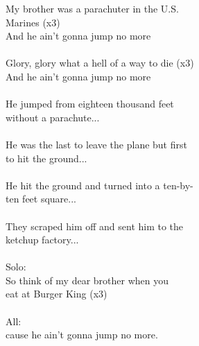 
My brother was a parachuter in the U.S. \\ Marines (x3) \\ And he ain't gonna jump no more \\ \hspace{10mm} \\ Glory, glory what a hell of a way to die (x3) \\ And he ain't gonna jump no more \\ \hspace{10mm} \\ He jumped from eighteen thousand feet \\ without a parachute... \\ \hspace{10mm} \\ He was the last to leave the plane but first \\ to hit the ground... \\ \hspace{10mm} \\ He hit the ground and turned into a ten-by- \\ ten feet square... \\ \hspace{10mm} \\ They scraped him off and sent him to the \\ ketchup factory... \\ \hspace{10mm} \\ Solo:  \\ So think of my dear brother when you \\ eat at Burger King (x3) \\ \hspace{10mm} \\ All:  \\ cause he ain't gonna jump no more.
